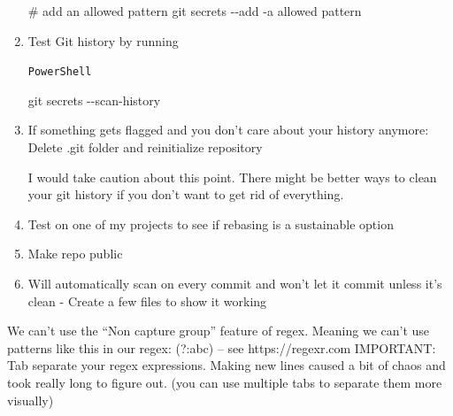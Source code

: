 \documentclass[
  letterpaper,
  DIV=11,
  numbers=noendperiod,
  oneside]{scrartcl}
\newenvironment{Shaded}{\begin{snugshade}}{\end{snugshade}}
\newcommand{\AttributeTok}[1]{\textcolor[rgb]{0.40,0.45,0.13}{#1}}
\newcommand{\CommentTok}[1]{\textcolor[rgb]{0.37,0.37,0.37}{#1}}
\newcommand{\FunctionTok}[1]{\textcolor[rgb]{0.28,0.35,0.67}{#1}}
\newcommand{\NormalTok}[1]{\textcolor[rgb]{0.00,0.23,0.31}{#1}}
\newcommand{\StringTok}[1]{\textcolor[rgb]{0.13,0.47,0.30}{#1}}
\begin{document}
\begin{enumerate}
\begin{codelisting}
\begin{Shaded}
\begin{Highlighting}[]
\CommentTok{\# add an allowed pattern}
\FunctionTok{git}\NormalTok{ secrets }\AttributeTok{{-}{-}add} \AttributeTok{{-}a} \StringTok{\textquotesingle{}allowed pattern\textquotesingle{}}
\end{Highlighting}
\end{Shaded}

  \end{codelisting}
\item
  Test Git history by running

  \begin{codelisting}

  \caption{\texttt{PowerShell}}

\begin{Shaded}
\begin{Highlighting}[]
\FunctionTok{git}\NormalTok{ secrets }\AttributeTok{{-}{-}scan{-}history}
\end{Highlighting}
\end{Shaded}

  \end{codelisting}
\item
  If something gets flagged and you don't care about your history
  anymore: Delete .git folder and reinitialize repository

  I would take caution about this point. There might be better ways to
  clean your git history if you don't want to get rid of everything.
\item
  Test on one of my projects to see if rebasing is a sustainable option
\item
  Make repo public
\item
  Will automatically scan on every commit and won't let it commit unless
  it's clean - Create a few files to show it working
\end{enumerate}

\begin{tcolorbox}[enhanced jigsaw, opacitybacktitle=0.6, bottomrule=.15mm, arc=.35mm, colframe=quarto-callout-note-color-frame, breakable, toptitle=1mm, bottomtitle=1mm, left=2mm, coltitle=black, opacityback=0, titlerule=0mm, toprule=.15mm, title=\textcolor{quarto-callout-note-color}{\faInfo}\hspace{0.5em}{Note}, colbacktitle=quarto-callout-note-color!10!white, rightrule=.15mm, leftrule=.75mm, colback=white]

We can't use the ``Non capture group'' feature of regex. Meaning we
can't use patterns like this in our regex: (?:abc) -- see
https://regexr.com IMPORTANT: Tab separate your regex expressions.
Making new lines caused a bit of chaos and took really long to figure
out. (you can use multiple tabs to separate them more visually)

\end{tcolorbox}
\end{document}
